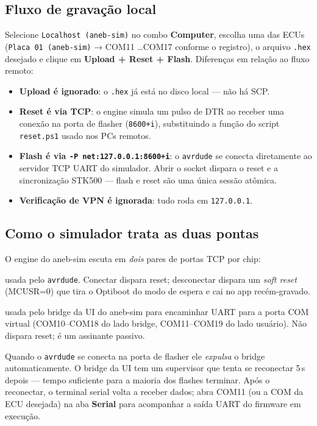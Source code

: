 \documentclass[12pt,a4paper]{article}
\begin{document}
\subsection{Fluxo de gravação local}

Selecione \texttt{Localhost (aneb-sim)} no combo \textbf{Computer}, escolha uma das ECUs (\texttt{Placa 01 (aneb-sim)} → COM11 \dots COM17 conforme o registro), o arquivo \texttt{.hex} desejado e clique em \textbf{Upload + Reset + Flash}. Diferenças em relação ao fluxo remoto:

\begin{itemize}[nosep]
  \item \textbf{Upload é ignorado}: o \texttt{.hex} já está no disco local — não há SCP.
  \item \textbf{Reset é via TCP}: o engine simula um pulso de DTR ao receber uma conexão na porta de flasher (\texttt{8600+i}), substituindo a função do script \texttt{reset.ps1} usado nos PCs remotos.
  \item \textbf{Flash é via \texttt{-P net:127.0.0.1:8600+i}}: o \texttt{avrdude} se conecta diretamente ao servidor TCP UART do simulador. Abrir o socket dispara o reset e a sincronização STK500 — flash e reset são uma única sessão atômica.
  \item \textbf{Verificação de VPN é ignorada}: tudo roda em \texttt{127.0.0.1}.
\end{itemize}

\subsection{Como o simulador trata as duas pontas}

O engine do aneb-sim escuta em \emph{dois} pares de portas TCP por chip:

\begin{description}[nosep]
  \item[\texttt{8600 + i} (\textit{flasher port})] usada pelo \texttt{avrdude}. Conectar dispara reset; desconectar dispara um \emph{soft reset} (MCUSR=0) que tira o Optiboot do modo de espera e cai no app recém-gravado.
  \item[\texttt{8700 + i} (\textit{bridge port})] usada pelo bridge da UI do aneb-sim para encaminhar UART para a porta COM virtual (COM10–COM18 do lado bridge, COM11–COM19 do lado usuário). Não dispara reset; é um assinante passivo.
\end{description}

Quando o \texttt{avrdude} se conecta na porta de flasher ele \emph{expulsa} o bridge automaticamente. O bridge da UI tem um supervisor que tenta se reconectar 5\,s depois — tempo suficiente para a maioria dos flashes terminar. Após o reconectar, o terminal serial volta a receber dados; abra COM11 (ou a COM da ECU desejada) na aba \textbf{Serial} para acompanhar a saída UART do firmware em execução.
\end{document}

